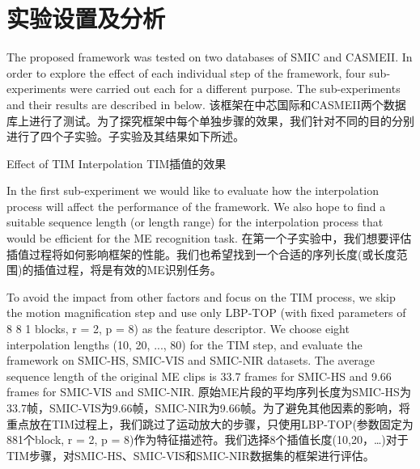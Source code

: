 \section{实验设置及分析}

The proposed framework was tested on two databases of SMIC and CASMEII. In order to explore the effect of each individual step of the framework, four sub-experiments were carried out each for a different purpose. The sub-experiments and their results are described in below.
该框架在中芯国际和CASMEII两个数据库上进行了测试。为了探究框架中每个单独步骤的效果，我们针对不同的目的分别进行了四个子实验。子实验及其结果如下所述。

Effect of TIM Interpolation
TIM插值的效果

In the first sub-experiment we would like to evaluate how the interpolation process will affect the performance of the framework. We also hope to find a suitable sequence length (or length range) for the interpolation process that would be efficient for the ME recognition task.
在第一个子实验中，我们想要评估插值过程将如何影响框架的性能。我们也希望找到一个合适的序列长度(或长度范围)的插值过程，将是有效的ME识别任务。

To avoid the impact from other factors and focus on the TIM process, we skip the motion magnification step and use only LBP-TOP (with fixed parameters of 8 8 1 blocks, r = 2, p = 8) as the feature descriptor. We choose eight interpolation lengths (10, 20, ..., 80) for the TIM step, and evaluate the framework on SMIC-HS, SMIC-VIS and SMIC-NIR datasets. The average sequence length of the original ME clips is 33.7 frames for SMIC-HS and 9.66 frames for SMIC-VIS and SMIC-NIR.
原始ME片段的平均序列长度为SMIC-HS为33.7帧，SMIC-VIS为9.66帧，SMIC-NIR为9.66帧。为了避免其他因素的影响，将重点放在TIM过程上，我们跳过了运动放大的步骤，只使用LBP-TOP(参数固定为881个block, r = 2, p = 8)作为特征描述符。我们选择8个插值长度(10,20，…)对于TIM步骤，对SMIC-HS、SMIC-VIS和SMIC-NIR数据集的框架进行评估。


